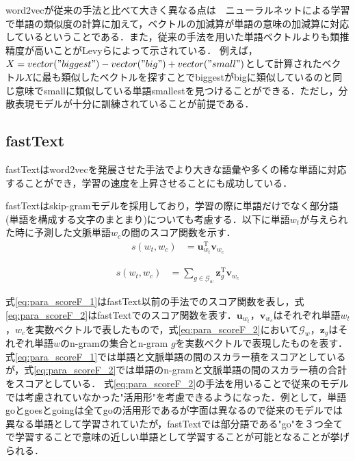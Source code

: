 word2vecが従来の手法と比べて大きく異なる点は　ニューラルネットによる学習で単語の類似度の計算に加えて，ベクトルの加減算が単語の意味の加減算に対応しているということである．また，従来の手法を用いた単語ベクトルよりも類推精度が高いことがLevyら\cite{levy2014neural}によって示されている．
例えば，$X=vector("biggest") - vector("big") + vector("small")$として計算されたベクトル$X$に最も類似したベクトルを探すことでbiggestがbigに類似しているのと同じ意味でsmallに類似している単語smallestを見つけることができる．ただし，分散表現モデルが十分に訓練されていることが前提である．

\subsection{fastText}
fastText\cite{fastText}\cite{fastText2}はword2vecを発展させた手法でより大きな語彙や多くの稀な単語に対応することができ，学習の速度を上昇させることにも成功している．

fastTextはskip-gramモデルを採用しており，学習の際に単語だけでなく部分語(単語を構成する文字のまとまり)についても考慮する．以下に単語$w_t$が与えられた時に予測した文脈単語$w_c$の間のスコア関数を示す．
\begin{equation}
\begin{aligned}
\label{eq:para_scoreF_1}
s(w_t , w_c) & = \bm{ u }^{\mathrm{T}}_{w_t} \bm{v}_{w_c}
\end{aligned}
\end{equation}

\begin{equation}
\begin{aligned}
\label{eq:para_scoreF_2}
s(w_t , w_c) & =  \sum_{g \in \mathcal{G}_w} \bm{ z }^{\mathrm{T}}_{g} \bm{v}_{w_c}
\end{aligned}
\end{equation}

式\ref{eq:para_scoreF_1}はfastText以前の手法でのスコア関数を表し，式\ref{eq:para_scoreF_2}はfastTextでのスコア関数を表す．$\bm{u}_{w_{t}}$，$\bm{v}_{w_c}$はそれぞれ単語$w_t$，$w_c$を実数ベクトルで表したもので，式\ref{eq:para_scoreF_2}において$\mathcal{G}_w$，$\bm{z}_{g}$はそれぞれ単語$w$のn-gramの集合とn-gram $g$を実数ベクトルで表現したものを表す．
式\ref{eq:para_scoreF_1}では単語と文脈単語の間のスカラー積をスコアとしているが，式\ref{eq:para_scoreF_2}では単語のn-gramと文脈単語の間のスカラー積の合計をスコアとしている．
式\ref{eq:para_scoreF_2}の手法を用いることで従来のモデルでは考慮されていなかった"活用形"を考慮できるようになった．例として，単語 goとgoesとgoingは全てgoの活用形であるが字面は異なるので従来のモデルでは異なる単語として学習されていたが，fastTextでは部分語である"go"を３つ全てで学習することで意味の近しい単語として学習することが可能となることが挙げられる．

